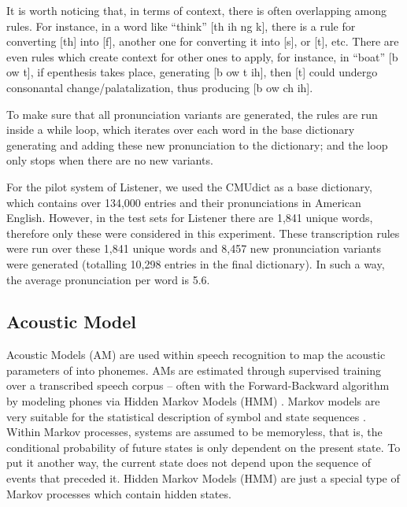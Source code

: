 \documentclass[twocolumn]{bmcart}%
\begin{document}
It is worth noticing that, in terms of context, there is often overlapping among rules. For instance, in a word like ``think'' [th ih ng k], there is a rule for converting [th] into [f], another one for converting it into [s], or [t], etc. There are even rules which create context for other ones to apply, for instance, in ``boat'' [b ow t], if epenthesis takes place, generating [b ow t ih], then [t] could undergo consonantal change/palatalization, thus producing [b ow ch ih].

To make sure that all pronunciation variants are generated, the rules are run inside a while loop, which iterates over each word in the base dictionary generating and adding these new pronunciation to the dictionary; and the loop only stops when there are no new variants.

For the pilot system of Listener, we used the CMUdict \cite{CMUDict2008} as a base dictionary, which contains over 134,000 entries and their pronunciations in American English. However, in the test sets for Listener there are 1,841 unique words, therefore only these were considered in this experiment. These transcription rules were run over these 1,841 unique words and 8,457 new pronunciation variants were generated (totalling 10,298 entries in the final dictionary). In such a way, the average pronunciation per word is 5.6. 

\subsection{Acoustic Model}

Acoustic Models (AM) are used within speech recognition to map the acoustic parameters of into phonemes.  AMs are estimated through supervised training over a transcribed speech corpus -- often with the Forward-Backward algorithm by modeling phones via Hidden Markov Models (HMM) \cite{Rabiner1989}. Markov models are very suitable for the statistical description of symbol and state sequences \cite{Fink2014}. Within Markov processes, systems are assumed to be memoryless, that is, the conditional probability of future states is only dependent on the present state. To put it another way, the current state does not depend upon the 
sequence of events that preceded it. Hidden Markov Models (HMM) are just a special type of Markov processes which contain hidden states.
\end{document}

